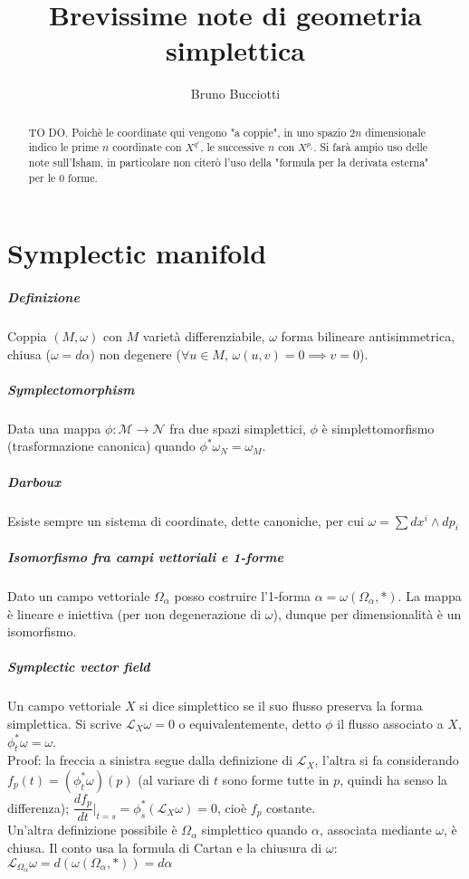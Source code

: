 \documentclass[]{article}
\title{Brevissime note di geometria simplettica}
\author{Bruno Bucciotti}
\newcommand{\w}{\omega}
\begin{document}
	
\maketitle
	
\begin{abstract}
	TO DO. Poichè le coordinate qui vengono "a coppie", in uno spazio $2n$ dimensionale indico le prime $n$ coordinate con $X^{q^i}$, le successive $n$ con $X^{p_i}$. Si farà ampio uso delle note sull'Isham, in particolare non citerò l'uso della "formula per la derivata esterna" per le 0 forme.
\end{abstract}
	
\section{Symplectic manifold}
\subparagraph{Definizione}
Coppia $(M, \w)$ con $M$ varietà differenziabile, $\w$ forma bilineare antisimmetrica, chiusa ($\w = d\alpha$) non degenere ($\forall u\in M,\, \w(u, v) = 0 \implies v=0$).

\subparagraph{Symplectomorphism}
Data una mappa $\phi: \mathcal{M} \rightarrow \mathcal{N}$ fra due spazi simplettici, $\phi$ è simplettomorfismo (trasformazione canonica) quando $\phi^*\w_N = \w_M$.

\subparagraph{Darboux}
Esiste sempre un sistema di coordinate, dette canoniche, per cui $\w = \sum dx^i \wedge dp_i$

\subparagraph{Isomorfismo fra campi vettoriali e 1-forme}
Dato un campo vettoriale $\Omega_\alpha$ posso costruire l'1-forma $\alpha = \w(\Omega_\alpha, *)$. La mappa è lineare e iniettiva (per non degenerazione di $\w$), dunque per dimensionalità è un isomorfismo.

\subparagraph{Symplectic vector field}
Un campo vettoriale $X$ si dice simplettico se il suo flusso preserva la forma simplettica. Si scrive $\mathcal{L}_X \w = 0$ o equivalentemente, detto $\phi$ il flusso associato a $X$, $\phi_t^* \w = \w$.\\
Proof: la freccia a sinistra segue dalla definizione di $\mathcal{L}_X$, l'altra si fa considerando $f_p(t) = (\phi_t^* \w)(p)$ (al variare di $t$ sono forme tutte in $p$, quindi ha senso la differenza); $\dfrac{df_p}{dt} |_{t=s} = \phi_s^* (\mathcal{L}_X \w) = 0$, cioè $f_p$ costante.\\
Un'altra definizione possibile è $\Omega_\alpha$ simplettico quando $\alpha$, associata mediante $\w$, è chiusa. Il conto usa la formula di Cartan e la chiusura di $\w$: $\mathcal{L}_{\Omega_\alpha} \w = d (\w(\Omega_\alpha, *) ) = d\alpha$
\end{document}

